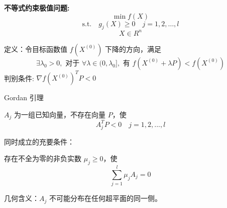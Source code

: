 \documentclass[12pt, a4paper, oneside, UTF8]{ctexbook}
\begin{document}
\textbf{不等式约束极值问题:}
\[
\min f(X)
\]
\[
\text{s.t.} \quad g_j(X) \geq 0 \quad j = 1, 2, \ldots, l
\]
\[
X \in R^n
\]

\begin{definition}
    定义：令目标函数值 \( f(X^{(0)}) \) 下降的方向，满足
\[
\exists \lambda_0 > 0, \text{ 对于 } \forall \lambda \in (0, \lambda_0], \text{ 有 } f(X^{(0)} + \lambda P) < f(X^{(0)})
\]
判别条件: \(\nabla f(X^{(0)})^T P < 0\)
\end{definition}

\begin{theorem}
Gordan 引理

\( A_j \) 为一组已知向量，不存在向量 \( P \)，使
\[
A_j^T P < 0 \quad j = 1, 2, ..., l
\]

同时成立的充要条件：

存在不全为零的非负实数 \( \mu_j \geq 0 \)，使
\[
\sum_{j=1}^{l} \mu_j A_j = 0
\]

几何含义：\( A_j \) 不可能分布在任何超平面的同一侧。
\end{theorem}
\end{document}
